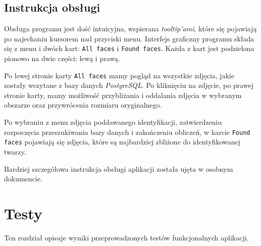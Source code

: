 \documentclass[a4paper,titlepage]{article}
\theoremstyle{break}
\numberwithin{equation}{subsection}
\begin{document}

\subsection{Instrukcja obsługi}

Obsługa programu jest dość intuicyjna, wspierana \emph{tooltip'ami}, które się pojawiają po najechaniu kursorem nad przyciski menu. Interfejs graficzny programu składa się z menu i dwóch kart: \texttt{All faces} i \texttt{Found faces}. Każda z  kart jest podzielona pionowo na dwie części: lewą i prawą.

Po lewej stronie karty \texttt{All faces} mamy pogląd na wszystkie zdjęcia, jakie zostały wczytane z bazy danych \emph{PostgreSQL}. Po kliknięciu na zdjęcie, po prawej stronie karty, mamy możliwość przybliżania i oddalania zdjęcia w wybranym obszarze oraz przywrócenia rozmiaru oryginalnego.

Po wybraniu z menu zdjęcia poddawanego identyfikacji, zatwierdzeniu rozpoczęcia przeszukiwania bazy danych i zakończeniu obliczeń, w karcie \texttt{Found faces} pojawiają się zdjęcia, które są najbardziej zbliżone do identyfikowanej twarzy. %

Bardziej szczegółowa instrukcja obsługi aplikacji została ujęta w osobnym dokumencie.


\section{Testy}
\label{sec:testy}

Ten rozdział opisuje wyniki przeprowadzonych testów funkcjonalnych aplikacji.


\newpage
\end{document}
